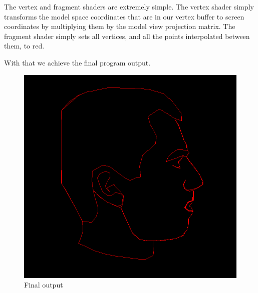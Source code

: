 \documentclass[12pt]{article}
\begin{document}
The vertex and fragment shaders are extremely simple. The vertex shader simply
transforms the model space coordinates that are in our vertex buffer to screen
coordinates by multiplying them by the model view projection matrix. The
fragment shader simply sets all vertices, and all the points interpolated
between them, to red.




With that we achieve the final program output.

\begin{figure}[H]
    \centering
    \includegraphics[width=0.45\linewidth]{screenshot.png}
    \caption{Final output}
\end{figure}

\newpage

\newpage

\end{document}
